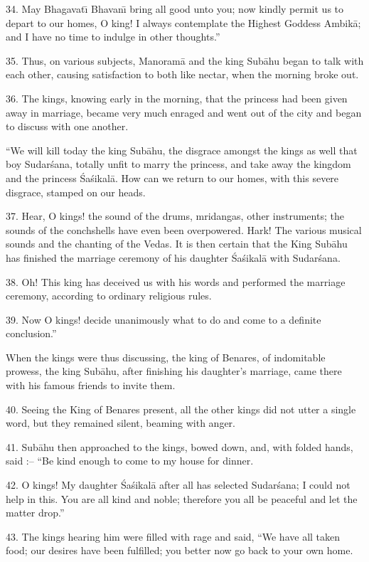 34. May Bhagavat\={\i} Bhavan\={\i} bring all good unto you; now kindly permit us to depart to our homes, O king! I always contemplate the Highest Goddess Ambik\=a; and I have no time to indulge in other thoughts.''

35. Thus, on various subjects, Manoram\=a and the king Sub\=ahu began to talk with each other, causing satisfaction to both like nectar, when the morning broke out.

36. The kings, knowing early in the morning, that the princess had been given away in marriage, became very much enraged and went out of the city and began to discuss with one another.

``We will kill today the king Sub\=ahu, the disgrace amongst the kings as well that boy Sudar\'sana, totally unfit to marry the princess, and take away the kingdom and the princess \'Sa\'sikal\=a. How can we return to our homes, with this severe disgrace, stamped on our heads.

37. Hear, O kings! the sound of the drums, mridangas, other instruments; the sounds of the conchshells have even been overpowered. Hark! The various musical sounds and the chanting of the Vedas. It is then certain that the King Sub\=ahu has finished the marriage ceremony of his daughter \'Sa\'sikal\=a with Sudar\'sana.

38. Oh! This king has deceived us with his words and performed the marriage ceremony, according to ordinary religious rules.

39. Now O kings! decide unanimously what to do and come to a definite conclusion.''

When the kings were thus discussing, the king of Benares, of indomitable prowess, the king Sub\=ahu, after finishing his daughter's marriage, came there with his famous friends to invite them.

40. Seeing the King of Benares present, all the other kings did not utter a single word, but they remained silent, beaming with anger.

41. Sub\=ahu then approached to the kings, bowed down, and, with folded hands, said :-- ``Be kind enough to come to my house for dinner.

42. O kings! My daughter \'Sa\'sikal\=a after all has selected Sudar\'sana; I could not help in this. You are all kind and noble; therefore you all be peaceful and let the matter drop.''

43. The kings hearing him were filled with rage and said, ``We have all taken food; our desires have been fulfilled; you better now go back to your own home.

